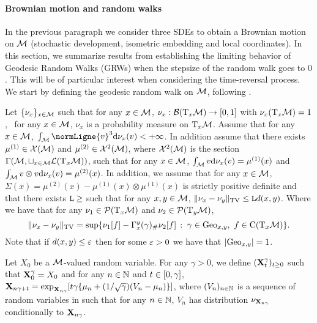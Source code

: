     \paragraph{Brownian motion and random walks}

    In the previous paragraph we consider three SDEs to obtain a Brownian motion
    on $\mathcal M$ (stochastic development, isometric embedding and local
    coordinates). In this section, we summarize results from
    \cite{jorgensen1975central} establishing the limiting behavior of Geodesic
    Random Walks (GRWs) when the stepsize of the random walk goes to $0$. This will be
    of particular interest when considering the time-reversal process. We start
    by defining the geodesic random walk on $\mathcal M$, following \citet[Section
    2]{jorgensen1975central}.

    Let $\{ \nu_x \}_{x \in \mathcal M}$ such that for any $x \in \mathcal M$,
    $\nu_x: \mathcal{B}(\mathrm{T}_x \mathcal M) \to \left[0,1\right]$ with
    $\nu_x(\mathrm{T}_x \mathcal M) =1$, \ie \ for any $x \in \mathcal M$, $\nu_x$ is a
    probability measure on $\mathrm{T}_x \mathcal M$. Assume that for any $x \in \mathcal M$,
    $\int_{\M} \normLigne{v}^3 \rmd \nu_x(v)< +\infty$. In addition assume that
    there exists $\mu^{(1)} \in \mathcal{X}(\mathcal{M})$ and $\mu^{(2)} \in \mathcal{X}^2(\mathcal{M})$, where
    $\mathcal{X}^2(\mathcal{M})$ is the section
    $\Gamma(\mathcal M, \sqcup_{x \in \mathcal M} \mathcal{L}(\mathrm{T}_x \mathcal M))$, such that for
    any $x \in \mathcal M$, $\int_{\mathcal M} v \mathrm{d} \nu_x(v) = \mu^{(1)}(x)$ and
    $\int_{\mathcal M} v \otimes v \mathrm{d} \nu_x(v) = \mu^{(2)}(x)$. In addition, we assume
    that for any $x \in \mathcal M$,
    $\Sigma(x) = \mu^{(2)}(x) - \mu^{(1)}(x) \otimes \mu^{(1)}(x)$ is strictly
    positive definite and that there exists $\mathtt{L} \geq$ such that for any
    $x, y \in \mathcal M$, $\| \nu_x - \nu_y \|_{\mathrm{TV}} \leq \mathtt{L} d(x,y)$. Where we have that
    for any $\nu_1 \in \mathcal{P}(\mathrm{T}_x \mathcal M)$ and $\nu_2 \in \mathcal{P}(\mathrm{T}_y \mathcal M)$,
    \begin{equation}
      \| \nu_x - \nu_y \|_{\mathrm{TV}} = \sup \{\nu_1[f] - \Gamma_{x}^y(\gamma)_\# \nu_2[f]\,:\; \gamma \in \mathrm{Geo}_{x,y}, \ f \in \mathrm{C}(\mathrm{T}_x \mathcal M)\}  . 
    \end{equation}
    Note that if $d(x,y) \leq \varepsilon$ then for some $\varepsilon > 0$ we have that $\left\vert \mathrm{Geo}_{x,y} \right\vert=1$.


    \begin{definition}
      Let $X_0$ be a $\mathcal M$-valued random variable.  For any $\gamma > 0$, we
      define $(\mathbf{X}_t^{\gamma})_{t \geq 0}$ such that $\mathbf{X}_0^\gamma = X_0$ and
      for any $n \in \mathbb{N}$ and $t \in \left[0, \gamma\right]$,
      $\mathbf{X}_{n\gamma + t} = \exp_{\mathbf{X}_{n \gamma}}[t\gamma \{ \mu_n +
      (1/\sqrt{\gamma}) (V_n - \mu_n)\}]$, where $(V_n)_{n \in \mathbb{N}}$ is a sequence
      of random variables in such that for any $n \in \mathbb{N}$, $V_n$
      has distribution $\nu_{\mathbf{X}_{n \gamma}}$ conditionally to $\mathbf{X}_{n \gamma}$.
    \end{definition}

